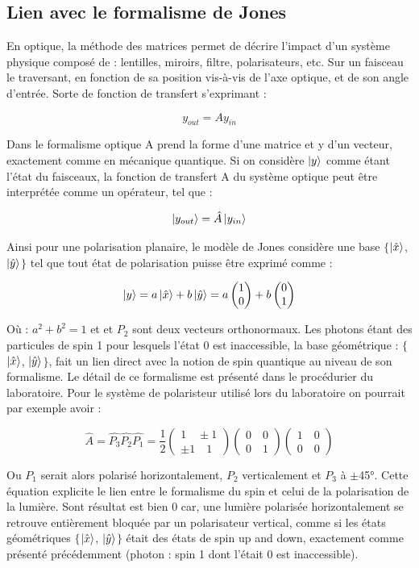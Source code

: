 \documentclass[11pt,letterpaper]{article}
\newcommand*{\Coord}[2]{%
    \begin{pmatrix} 
      #1\\ 
      #2 
    \end{pmatrix}}
\begin{document}
\subsection{Lien avec le formalisme de Jones}

En optique, la méthode des matrices permet de décrire l'impact d'un système physique composé de : lentilles, miroirs, filtre, polarisateurs, etc. Sur un faisceau le traversant, en fonction de sa position vis-à-vis de l'axe optique, et de son angle d'entrée. Sorte de fonction de transfert s'exprimant : 

\begin{equation*}
    y_{out} = Ay_{in}
\end{equation*}

Dans le formalisme optique A prend la forme d'une matrice et y d'un vecteur, exactement comme en mécanique quantique. Si on considère $\ket{y}$ comme étant l'état du faisceaux, la fonction de transfert A du système optique peut être interprétée comme un opérateur, tel que : 

\begin{equation*}
    \ket{y_{out}} = \hat{A}\ket{y_{in}}
\end{equation*}

Ainsi pour une polarisation planaire, le modèle de Jones considère une base $\{$$\ket{\hat{x}}$, $\ket{\hat{y}}$$\}$ tel que tout état de polarisation puisse être exprimé comme :

\begin{equation*}
    \ket{y} = a\ket{\hat{x}} + b\ket{\hat{y}} = a\Coord{1}{0} + b\Coord{0}{1}
\end{equation*}

Où : $a^2 + b^2 = 1$ et et $P_2$  sont deux vecteurs orthonormaux. Les photons étant des particules de spin 1 pour lesquels l'état 0 est inaccessible, la base géométrique : $\{$$\ket{\hat{x}}$, $\ket{\hat{y}}$$\}$, fait un lien direct avec la notion de spin quantique au niveau de son formalisme. Le détail de ce formalisme est présenté dans le procédurier du laboratoire. Pour le système de polaristeur utilisé lors du laboratoire on pourrait par exemple avoir : 

\begin{equation*}
    \hat{A} = \hat{P_3}\hat{P_2}\hat{P_1} = \frac{1}{2}\Coord{1 \quad \pm 1}{\pm 1 \quad 1}\Coord{0 \quad 0}{0 \quad 1}\Coord{1 \quad 0}{0 \quad 0}
\end{equation*}

Ou $P_1$ serait alors polarisé horizontalement, $P_2$ verticalement et $P_3$ à $\pm$45°. Cette équation explicite le lien entre le formalisme du spin et celui de la polarisation de la lumière. Sont résultat est bien 0 car, une lumière polarisée horizontalement se retrouve entièrement bloquée par un polarisateur vertical, comme si les états géométriques $\{$$\ket{\hat{x}}$, $\ket{\hat{y}}$$\}$ était des états de spin up and down, exactement comme présenté précédemment (photon : spin 1 dont l'était 0 est inaccessible).
\end{document}
